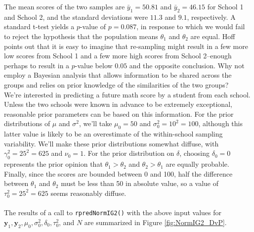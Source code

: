 \documentclass[12pt, a4paper]{article}
\begin{document}
\noindent The mean scores of the two samples are $\bar{y}_1 = 50.81$ and $\bar{y}_2 = 46.15$ for School 1 and School 2, and the standard deviations were $11.3$ and $9.1$, respectively.  A standard t-test yields a $p$-value of $p = 0.087$, in response to which we would fail to reject the hypothesis that the population means $\theta_1$ and $\theta_2$ are equal. Hoff points out that it is easy to imagine that re-sampling might result in a few more low scores from School 1 and a few more high scores from School 2--enough perhaps to result in a $p$-value below $0.05$ and the opposite conclusion. Why not employ a Bayesian analysis that allows information to be shared across the groups and relies on prior knowledge of the similarities of the two groups?\\

\noindent We're interested in predicting a future math score by a student from each school.  Unless the two schools were known in advance to be extremely exceptional, reasonable prior parameters can be based on this information.  For the prior distributions of $\mu$ and $\sigma^2$, we'll take $\mu_0 = 50$ and $\sigma^2_0 = 10^2 = 100$, although this latter value is likely to be an overestimate of the within-school sampling variability.  We'll make these prior distributions somewhat diffuse, with $\gamma^2_0 = 25^2 = 625$ and $\nu_0 = 1$.  For the prior distribution on $\delta$, choosing $\delta_0 = 0$ represents the prior opinion that $\theta_1 > \theta_2$ and $\theta_2 > \theta_1$ are equally probable.  Finally, since the scores are bounded between 0 and 100, half the difference between $\theta_1$ and $\theta_2$ must be less than 50 in absolute value, so a value of $\tau^2_0 = 25^2 = 625$ seems reasonably diffuse.\\\\

\noindent The results of a call to \texttt{rpredNormIG2()} with the above input values for $\mathbf{y}_1,\mathbf{y}_2,\mu_0,\sigma^2_0,\delta_0,\tau^2_0$, and $N$ are summarized in Figure \ref{fig:NormIG2_DvP}.\\
\end{document}
